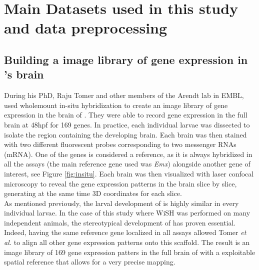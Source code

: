 \chapter{Main Datasets used in this study and data preprocessing}\label{ch:singlecell}
\section{Building a image library of gene expression in \platy{}'s brain}
     During his PhD, Raju Tomer and other members of the Arendt lab in EMBL, used wholemount in-situ hybridization to create an image library of gene expression in the brain of \platy{}. They were able to record gene expression in the full brain at 48hpf for 169 genes. In practice, each individual larvae was dissected to isolate the region containing the developing brain. Each brain was then stained with two different fluorescent probes corresponding to two messenger RNAs (mRNA). One of the genes is considered a reference, as it is always hybridized in all the assays (the main reference gene used was \emph{Emx}) alongside another gene of interest, see Figure \ref{fig:insitu}. Each brain was then visualized with laser confocal microscopy to reveal the gene expression patterns in the brain slice by slice, generating at the same time 3D coordinates for each slice.\\
     
     As mentioned previously, the larval development of \platy{} is highly similar in every individual larvae. In the case of this study where WiSH was performed on many independent animals, the stereotypical development of \platy{} has proven essential. Indeed, having the same reference gene localized in all assays allowed Tomer \emph{et al.} to align all other gene expression patterns onto this scaffold. The result is an image library of 169 gene expression patters in the full brain of \platy{} with a exploitable spatial reference that allows for a very precise mapping.\\
    
